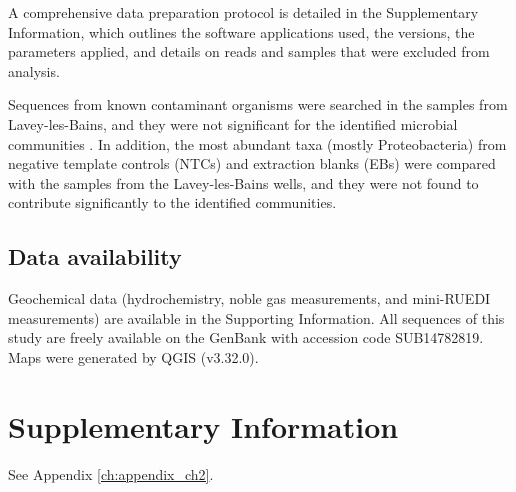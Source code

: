 A comprehensive data preparation protocol is detailed in the Supplementary Information, which outlines the software applications used, the versions, the parameters applied, and details on reads and samples that were excluded from analysis.

Sequences from known contaminant organisms were searched in the samples from Lavey-les-Bains, and they were not significant for the identified microbial communities \citep{salter2014reagent, sheik2018identification}.
In addition, the most abundant taxa (mostly Proteobacteria) from negative template controls (NTCs) and extraction blanks (EBs) were compared with the samples from the Lavey-les-Bains wells, and they were not found to contribute significantly to the identified communities.

\subsection*{Data availability}
Geochemical data (hydrochemistry, noble gas measurements, and mini-RUEDI measurements) are available in the Supporting Information.
All sequences of this study are freely available on the GenBank with accession code SUB14782819.
Maps were generated by QGIS (v3.32.0).

\section{Supplementary Information}
See Appendix \ref{ch:appendix_ch2}.